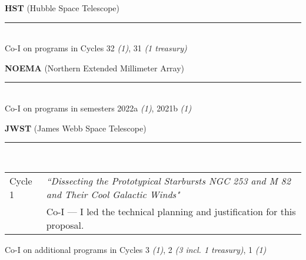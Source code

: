\documentclass[11pt]{article}
\makeatletter
\def\vhrulefill#1{\leavevmode\leaders\hrule\@height#1\hfill \kern\z@}
\makeatother
\begin{document}
{\bf HST} {\small (Hubble Space Telescope)} \vhrulefill{0.5pt}\\
Co-I on programs in Cycles 32 {\em(1)}, 31 {\em(1 treasury)}\medskip


{\bf NOEMA} {\small (Northern Extended Millimeter Array)} \vhrulefill{0.5pt}\\
Co-I on programs in semesters 2022a {\em(1)}, 2021b {\em(1)}\medskip


{\bf JWST} {\small (James Webb Space Telescope)} \vhrulefill{0.5pt}\\
\vspace{-20pt}
\begin{longtable}{p{}p{}}
Cycle 1 &  \textit{``Dissecting the Prototypical Starbursts NGC 253 and M 82 and Their Cool Galactic Winds"}\\
& {\small Co-I --- I led the technical planning and justification for this proposal.}\\
\end{longtable}
\vspace{-12pt}
Co-I on additional programs in Cycles 3 {\em(1)}, 2 {\em(3 incl. 1 treasury)}, 1 {\em(1)}\medskip
\end{document}
